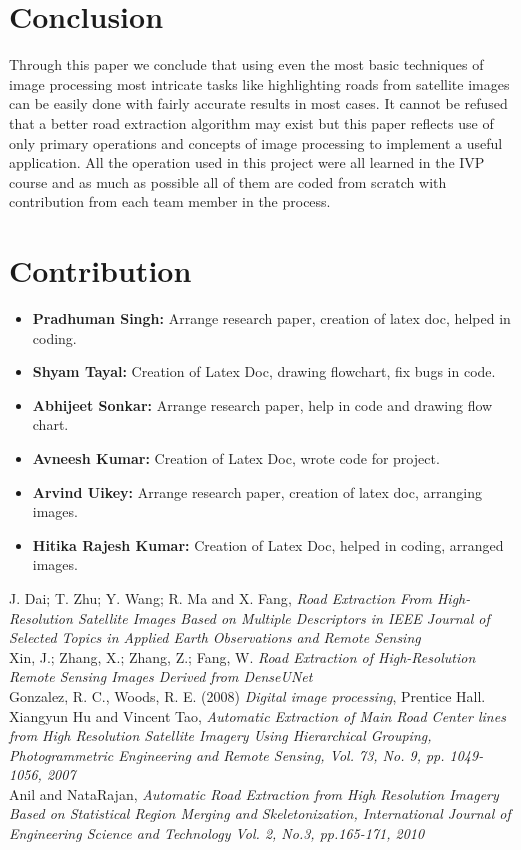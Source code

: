 \documentclass[12pt,a4paper]{article}
\begin{document}
\section{Conclusion}
Through this paper we conclude that using even the most basic techniques of image processing most intricate tasks like highlighting roads from satellite images can be easily done with fairly accurate results in most cases.
It cannot be refused that a better road extraction algorithm may exist but this paper reflects use of only primary operations and concepts of image processing to implement a useful application.
All the operation used in this project were all learned in the IVP course and as much as possible all of them are coded from scratch with contribution from each team member in the process.
\newpage
\section{Contribution}
\begin{itemize}
  \item \textbf{Pradhuman Singh: } Arrange research paper, creation of latex doc, helped in coding.
  \item \textbf{Shyam Tayal: } Creation of Latex Doc, drawing flowchart, fix bugs in code.
  \item \textbf{Abhijeet Sonkar: } Arrange research paper, help in code and drawing flow chart.
  \item \textbf{Avneesh Kumar: } Creation of Latex Doc, wrote code for project.
  \item \textbf{Arvind Uikey: } Arrange research paper, creation of latex doc, arranging images.
  \item \textbf{Hitika Rajesh Kumar: } Creation of Latex Doc, helped in coding, arranged images.
\end{itemize}

\newpage

\begin{thebibliography}{9}
{J. Dai; T. Zhu; Y. Wang; R. Ma and X. Fang}, \emph{Road Extraction From High-Resolution Satellite Images Based on Multiple Descriptors in IEEE Journal of Selected Topics in Applied Earth Observations and Remote Sensing}
\\ [0.01in]
Xin, J.; Zhang, X.; Zhang, Z.; Fang, W. \emph{Road Extraction of High-Resolution Remote Sensing
Images Derived from DenseUNet}
\\ [0.01in]
Gonzalez, R. C., Woods, R. E. (2008) \emph{Digital image processing}, Prentice Hall.
\\ [0.01in]
Xiangyun Hu and Vincent Tao, \emph{Automatic Extraction of Main Road Center lines from High Resolution Satellite Imagery Using Hierarchical Grouping, Photogrammetric Engineering and Remote Sensing, Vol. 73, No. 9, pp. 1049- 1056, 2007}
\\ [0.01in]
 Anil and NataRajan, \emph{Automatic Road Extraction from High Resolution Imagery Based on Statistical Region Merging and Skeletonization, International Journal of Engineering Science and Technology Vol. 2, No.3, pp.165-171, 2010}

\end{thebibliography}
\end{document}
